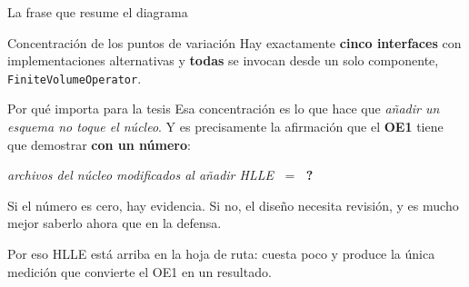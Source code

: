 \documentclass[aspectratio=169,10pt]{beamer}
\newcommand{\cod}[1]{\texttt{\small #1}}
\begin{document}
\begin{frame}[shrink]{La frase que resume el diagrama}

  \begin{block}{Concentración de los puntos de variación}
    Hay exactamente \textbf{cinco interfaces} con implementaciones alternativas y
    \textbf{todas} se invocan desde un solo componente,
    \cod{FiniteVolumeOperator}.
  \end{block}

  \begin{exampleblock}{Por qué importa para la tesis}
    Esa concentración es lo que hace que \emph{añadir un esquema no toque el
    núcleo}. Y es precisamente la afirmación que el \textbf{OE1} tiene que
    demostrar \textbf{con un número}:

    \begin{center}
      \textit{archivos del núcleo modificados al añadir HLLE} $\;=\;$ \textbf{?}
    \end{center}

    Si el número es cero, hay evidencia. Si no, el diseño necesita revisión, y es
    mucho mejor saberlo ahora que en la defensa.
  \end{exampleblock}

  \begin{center}
    \small\color{gris}
    Por eso HLLE está arriba en la hoja de ruta: cuesta poco y produce la única
    medición que convierte el OE1 en un resultado.
  \end{center}
\end{frame}
\end{document}
